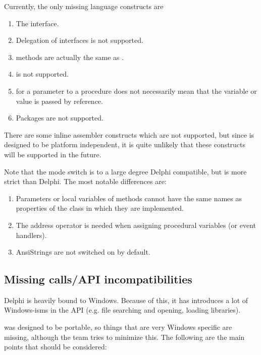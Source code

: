 Currently, the only missing language constructs are
\begin{enumerate}
\item The  interface.
\item Delegation of interfaces is not supported.
\item {} methods are actually the same as .
\item {} is not supported.
\item {} for a parameter to a procedure does not necessarily 
mean that the variable or value is passed by reference.
\item Packages are not supported.
\end{enumerate}

There are some inline assembler constructs which are not supported, 
but since \fpc is designed to be platform independent, it is quite 
unlikely that these constructs will be supported in the future.

Note that the  mode switch is to a large degree Delphi 
compatible, but is more strict than Delphi. The most notable differences
are:
\begin{enumerate}
\item Parameters or local variables of methods cannot have the same 
names as properties of the class in which they are implemented.
\item The address operator is needed when assigning procedural variables (or event handlers).
\item AnsiStrings are not switched on by default.
\end{enumerate}

\subsection{Missing calls/API incompatibilities}
Delphi is heavily bound to Windows. Because of this, it has introduces a lot of Windows-isms in the API (e.g. file searching and opening, loading libraries).

\fpc was designed to be portable, so things that are very Windows 
specific are missing, although the \fpc team tries to minimize this.
The following are the main points that should be considered:

